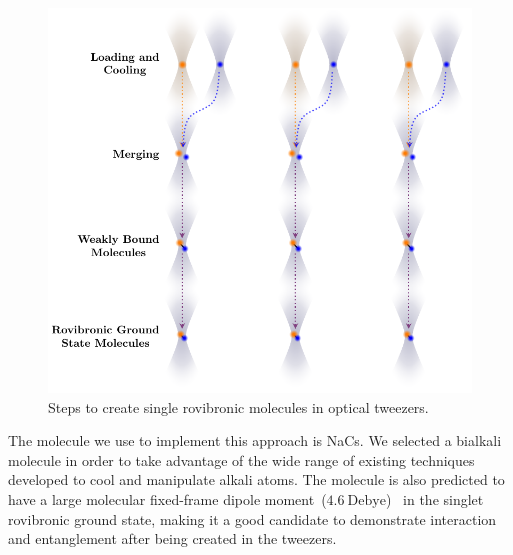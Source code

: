 \begin{figure}
  \centering
  \includegraphics[width=\textwidth]{figures/introduction_steps.pdf}
  \caption[Molecule creation steps.]{
    Steps to create single rovibronic molecules in optical tweezers.
    \label{fig:introduction:tweezers:plan:steps}}
\end{figure}

The molecule we use to implement this approach is NaCs.
We selected a bialkali molecule in order to take advantage of
the wide range of existing techniques developed to cool and manipulate alkali atoms.
The molecule is also predicted to have a large
molecular fixed-frame dipole moment~($4.6~\mathrm{Debye}$)~\cite{
  dagdigian_molecular_1972,deiglmayr_calculations_2008}
in the singlet rovibronic ground state,
making it a good candidate to demonstrate interaction and entanglement
after being created in the tweezers.

